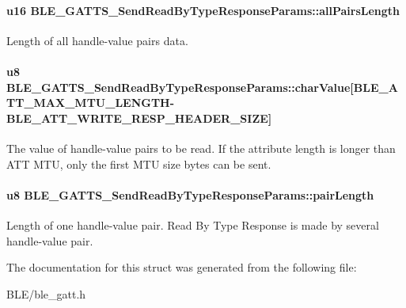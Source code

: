 \paragraph[{\texorpdfstring{all\+Pairs\+Length}{allPairsLength}}]{\setlength{\rightskip}{0pt plus 5cm}u16 B\+L\+E\+\_\+\+G\+A\+T\+T\+S\+\_\+\+Send\+Read\+By\+Type\+Response\+Params\+::all\+Pairs\+Length}\hypertarget{struct_b_l_e___g_a_t_t_s___send_read_by_type_response_params_ac13cc60b9b58b9a851d35fd943228d20}{}\label{struct_b_l_e___g_a_t_t_s___send_read_by_type_response_params_ac13cc60b9b58b9a851d35fd943228d20}
Length of all handle-\/value pairs data. 
\paragraph[{\texorpdfstring{char\+Value}{charValue}}]{\setlength{\rightskip}{0pt plus 5cm}u8 B\+L\+E\+\_\+\+G\+A\+T\+T\+S\+\_\+\+Send\+Read\+By\+Type\+Response\+Params\+::char\+Value\mbox{[}{\bf B\+L\+E\+\_\+\+A\+T\+T\+\_\+\+M\+A\+X\+\_\+\+M\+T\+U\+\_\+\+L\+E\+N\+G\+TH}-\/{\bf B\+L\+E\+\_\+\+A\+T\+T\+\_\+\+W\+R\+I\+T\+E\+\_\+\+R\+E\+S\+P\+\_\+\+H\+E\+A\+D\+E\+R\+\_\+\+S\+I\+ZE}\mbox{]}}\hypertarget{struct_b_l_e___g_a_t_t_s___send_read_by_type_response_params_ab635949a086ff203d37df1ec770a68a0}{}\label{struct_b_l_e___g_a_t_t_s___send_read_by_type_response_params_ab635949a086ff203d37df1ec770a68a0}
The value of handle-\/value pairs to be read. If the attribute length is longer than A\+TT M\+TU, only the first M\+TU size bytes can be sent. 
\paragraph[{\texorpdfstring{pair\+Length}{pairLength}}]{\setlength{\rightskip}{0pt plus 5cm}u8 B\+L\+E\+\_\+\+G\+A\+T\+T\+S\+\_\+\+Send\+Read\+By\+Type\+Response\+Params\+::pair\+Length}\hypertarget{struct_b_l_e___g_a_t_t_s___send_read_by_type_response_params_a4295128e899dad826a5a0b09c9c11525}{}\label{struct_b_l_e___g_a_t_t_s___send_read_by_type_response_params_a4295128e899dad826a5a0b09c9c11525}
Length of one handle-\/value pair. Read By Type Response is made by several handle-\/value pair. 

The documentation for this struct was generated from the following file\+:\begin{DoxyCompactItemize}
\item 
B\+L\+E/ble\+\_\+gatt.\+h\end{DoxyCompactItemize}
